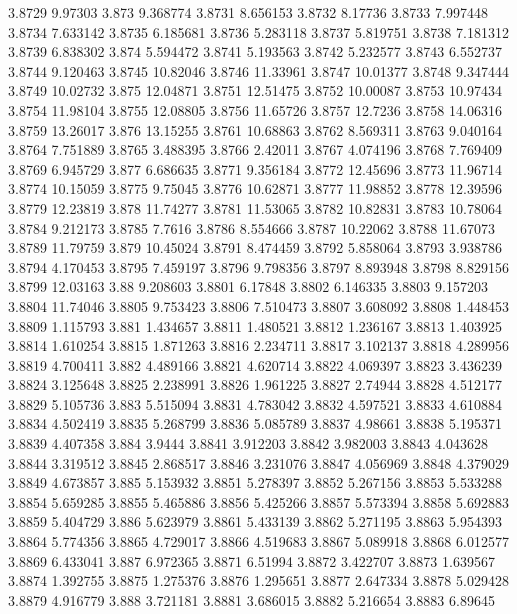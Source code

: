3.8729  9.97303
3.873  9.368774
3.8731  8.656153
3.8732  8.17736
3.8733  7.997448
3.8734  7.633142
3.8735  6.185681
3.8736  5.283118
3.8737  5.819751
3.8738  7.181312
3.8739  6.838302
3.874  5.594472
3.8741  5.193563
3.8742  5.232577
3.8743  6.552737
3.8744  9.120463
3.8745  10.82046
3.8746  11.33961
3.8747  10.01377
3.8748  9.347444
3.8749  10.02732
3.875  12.04871
3.8751  12.51475
3.8752  10.00087
3.8753  10.97434
3.8754  11.98104
3.8755  12.08805
3.8756  11.65726
3.8757  12.7236
3.8758  14.06316
3.8759  13.26017
3.876  13.15255
3.8761  10.68863
3.8762  8.569311
3.8763  9.040164
3.8764  7.751889
3.8765  3.488395
3.8766  2.42011
3.8767  4.074196
3.8768  7.769409
3.8769  6.945729
3.877  6.686635
3.8771  9.356184
3.8772  12.45696
3.8773  11.96714
3.8774  10.15059
3.8775  9.75045
3.8776  10.62871
3.8777  11.98852
3.8778  12.39596
3.8779  12.23819
3.878  11.74277
3.8781  11.53065
3.8782  10.82831
3.8783  10.78064
3.8784  9.212173
3.8785  7.7616
3.8786  8.554666
3.8787  10.22062
3.8788  11.67073
3.8789  11.79759
3.879  10.45024
3.8791  8.474459
3.8792  5.858064
3.8793  3.938786
3.8794  4.170453
3.8795  7.459197
3.8796  9.798356
3.8797  8.893948
3.8798  8.829156
3.8799  12.03163
3.88  9.208603
3.8801  6.17848
3.8802  6.146335
3.8803  9.157203
3.8804  11.74046
3.8805  9.753423
3.8806  7.510473
3.8807  3.608092
3.8808  1.448453
3.8809  1.115793
3.881  1.434657
3.8811  1.480521
3.8812  1.236167
3.8813  1.403925
3.8814  1.610254
3.8815  1.871263
3.8816  2.234711
3.8817  3.102137
3.8818  4.289956
3.8819  4.700411
3.882  4.489166
3.8821  4.620714
3.8822  4.069397
3.8823  3.436239
3.8824  3.125648
3.8825  2.238991
3.8826  1.961225
3.8827  2.74944
3.8828  4.512177
3.8829  5.105736
3.883  5.515094
3.8831  4.783042
3.8832  4.597521
3.8833  4.610884
3.8834  4.502419
3.8835  5.268799
3.8836  5.085789
3.8837  4.98661
3.8838  5.195371
3.8839  4.407358
3.884  3.9444
3.8841  3.912203
3.8842  3.982003
3.8843  4.043628
3.8844  3.319512
3.8845  2.868517
3.8846  3.231076
3.8847  4.056969
3.8848  4.379029
3.8849  4.673857
3.885  5.153932
3.8851  5.278397
3.8852  5.267156
3.8853  5.533288
3.8854  5.659285
3.8855  5.465886
3.8856  5.425266
3.8857  5.573394
3.8858  5.692883
3.8859  5.404729
3.886  5.623979
3.8861  5.433139
3.8862  5.271195
3.8863  5.954393
3.8864  5.774356
3.8865  4.729017
3.8866  4.519683
3.8867  5.089918
3.8868  6.012577
3.8869  6.433041
3.887  6.972365
3.8871  6.51994
3.8872  3.422707
3.8873  1.639567
3.8874  1.392755
3.8875  1.275376
3.8876  1.295651
3.8877  2.647334
3.8878  5.029428
3.8879  4.916779
3.888  3.721181
3.8881  3.686015
3.8882  5.216654
3.8883  6.89645
